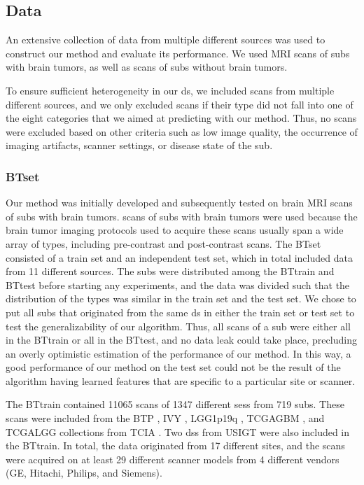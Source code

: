 \subsection{Data}

An extensive collection of data from multiple different sources was used to construct our method and evaluate its performance.
We used \gls{MRI} \glspl{scan} of \glspl{sub} with brain \glspl{tumor}, as well as \glspl{scan} of \glspl{sub} without brain \glspl{tumor}.

To ensure sufficient heterogeneity in our \gls{ds}, we included \glspl{scan} from multiple different sources, and we only excluded \glspl{scan} if their \gls{type} did not fall into one of the eight categories that we aimed at predicting with our method.
Thus, no \glspl{scan} were excluded based on other criteria such as low image quality, the occurrence of imaging artifacts, scanner settings, or disease state of the \gls{sub}.

\subsubsection{\Acrlong{BTset}}
Our method was initially developed and subsequently tested on brain \gls{MRI} \glspl{scan} of \glspl{sub} with brain \glspl{tumor}.
\Glspl{scan} of \glspl{sub} with brain \glspl{tumor} were used because the brain \gls{tumor} imaging protocols used to acquire these \glspl{scan} usually span a wide array of \glspl{type}, including pre-contrast and post-contrast \glspl{scan}.
The \gls{BTset} consisted of a train set and an independent test set, which in total included data from \num{11} different sources.
The \glspl{sub} were distributed among the \gls{BTtrain} and \gls{BTtest} before starting any experiments, and the data was divided such that the distribution of the \glspl{type} was similar in the train set and the test set.
We chose to put all \glspl{sub} that originated from the same \gls{ds} in either the train set or test set to test the generalizability of our algorithm.
Thus, all \glspl{scan} of a \gls{sub} were either all in the \gls{BTtrain} or all in the \gls{BTtest}, and no data leak could take place, precluding an overly optimistic estimation of the performance of our method.
In this way, a good performance of our method on the test set could not be the result of the algorithm having learned features that are specific to a particular \gls{site} or scanner.

The \gls{BTtrain} contained \num{11065} \glspl{scan} of \num{1347} different \glspl{ses} from \num{719} \glspl{sub}.
These \glspl{scan} were included from the \gls{BTP} \autocite{schmainda2018radiology}, \gls{IVY} \autocite{nameeta2016radiology}, \gls{LGG1p19q} \autocite{bradley2017radiology,akkus2017predicting}, \gls{TCGAGBM} \autocite{scarpace2016radiology}, and \gls{TCGALGG} \autocite{pedano2016radiology} collections from \gls{TCIA} \autocite{clark2013cancer}.
Two \glspl{ds} from \gls{USIGT} \autocite{fyllingen2016glioblastoma,xiao2017retrospective} were also included in the \gls{BTtrain}.
In total, the data originated from \num{17} different \glspl{site}, and the \glspl{scan} were acquired on at least \num{29} different scanner models from \num{4} different vendors (GE, Hitachi, Philips, and Siemens).

